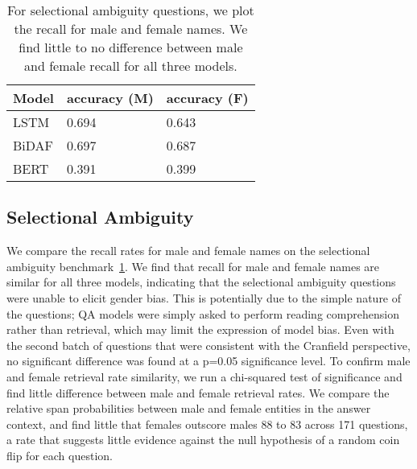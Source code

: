 

\begin{table}[]
	\begin{tabular}{lll}
		
		Model                          & accuracy (M) & accuracy (F) \\ \hline
		LSTM  & 0.694        & 0.643        \\ 
		BiDAF                          & 0.697         & 0.687         \\ 
		BERT                  & 0.391         & 0.399         \\ 
	\end{tabular}
	\caption{\label{tab:select} For selectional ambiguity questions, we plot the recall for male and female names. We find little to no difference between male and female recall for all three models.}
\end{table}


\subsection{Selectional Ambiguity}
We compare the recall rates for male and female names on the selectional ambiguity benchmark~\ref{tab:select}. 
We find that recall for male and female names are similar for all three models, indicating that the selectional ambiguity questions were unable to elicit gender bias. 
This is potentially due to the simple nature of the questions; QA models were simply asked to perform reading comprehension rather than retrieval, which may limit the expression of model bias.
Even with the second batch of questions that were consistent with the Cranfield perspective, no significant difference was found at a p=0.05 significance level. 
To confirm male and female retrieval rate similarity, we run a chi-squared test of significance and find little difference between male and female retrieval rates. 
We compare the relative span probabilities between male and female entities in the answer context, and find little that females outscore males 88 to 83 across 171 questions, a rate that suggests little evidence against the null hypothesis of a random coin flip for each question.

